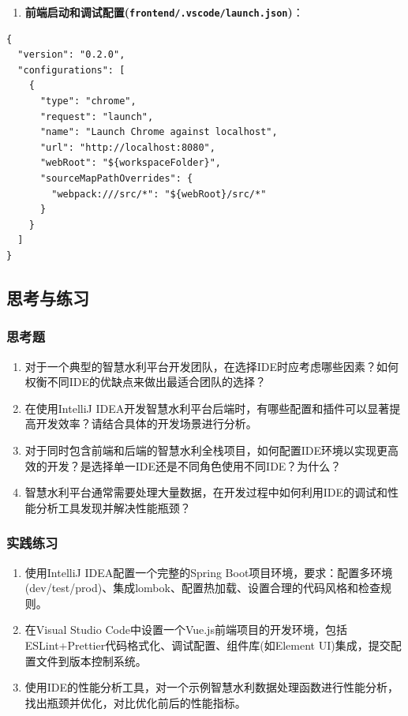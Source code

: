 \begin{enumerate}
\def\labelenumi{\arabic{enumi}.}
\setcounter{enumi}{3}
\tightlist
\item
  \textbf{前端启动和调试配置(\passthrough{\lstinline!frontend/.vscode/launch.json!})}：
\end{enumerate}

\begin{lstlisting}
{
  "version": "0.2.0",
  "configurations": [
    {
      "type": "chrome",
      "request": "launch",
      "name": "Launch Chrome against localhost",
      "url": "http://localhost:8080",
      "webRoot": "${workspaceFolder}",
      "sourceMapPathOverrides": {
        "webpack:///src/*": "${webRoot}/src/*"
      }
    }
  ]
}
\end{lstlisting}

\subsection{思考与练习}\label{ux601dux8003ux4e0eux7ec3ux4e60}

\subsubsection{思考题}\label{ux601dux8003ux9898}

\begin{enumerate}
\def\labelenumi{\arabic{enumi}.}
\item
  对于一个典型的智慧水利平台开发团队，在选择IDE时应考虑哪些因素？如何权衡不同IDE的优缺点来做出最适合团队的选择？
\item
  在使用IntelliJ
  IDEA开发智慧水利平台后端时，有哪些配置和插件可以显著提高开发效率？请结合具体的开发场景进行分析。
\item
  对于同时包含前端和后端的智慧水利全栈项目，如何配置IDE环境以实现更高效的开发？是选择单一IDE还是不同角色使用不同IDE？为什么？
\item
  智慧水利平台通常需要处理大量数据，在开发过程中如何利用IDE的调试和性能分析工具发现并解决性能瓶颈？
\end{enumerate}

\subsubsection{实践练习}\label{ux5b9eux8df5ux7ec3ux4e60}

\begin{enumerate}
\def\labelenumi{\arabic{enumi}.}
\item
  使用IntelliJ IDEA配置一个完整的Spring
  Boot项目环境，要求：配置多环境(dev/test/prod)、集成lombok、配置热加载、设置合理的代码风格和检查规则。
\item
  在Visual Studio
  Code中设置一个Vue.js前端项目的开发环境，包括ESLint+Prettier代码格式化、调试配置、组件库(如Element
  UI)集成，提交配置文件到版本控制系统。
\item
  使用IDE的性能分析工具，对一个示例智慧水利数据处理函数进行性能分析，找出瓶颈并优化，对比优化前后的性能指标。
\end{enumerate}
